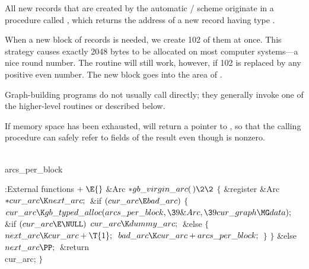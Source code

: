 All new  records that are created by the automatic /
scheme originate in a procedure called , which returns
the
address of a new record having type .

When a new block of  records is needed, we create 102 of them at
once.
This strategy causes exactly 2048 bytes to be allocated on most
computer systems---a nice round number. The routine will still work, however,
if 102 is replaced by any positive even number. The new block goes into
the  area of .

Graph-building programs do not usually call  directly;
they generally invoke one of the higher-level routines 
or  described below.

If memory space has been exhausted,  will return a
pointer to , so that the calling procedure can safely
refer to fields of the result even though  is
nonzero.

\Y\B\4\D\\{arcs\_per\_block}\5
\par
\Y\B\4:External functions\X${}\mathrel+\E{}$\6
\1\1\&{Arc} ${}{*}\\{gb\_virgin\_arc}(\,)\2\2{}$\6
${}\{{}$\5
\1\&{register} \&{Arc} ${}{*}\\{cur\_arc}\K\\{next\_arc};{}$\7
\&{if} ${}(\\{cur\_arc}\E\\{bad\_arc}){}$\5
${}\{{}$\1\6
${}\\{cur\_arc}\K\\{gb\_typed\_alloc}(\\{arcs\_per\_block},\39\&{Arc},\39\\{cur%
\_graph}\MG\\{data});{}$\6
\&{if} ${}(\\{cur\_arc}\E\NULL){}$\1\5
${}\\{cur\_arc}\K\\{dummy\_arc};{}$\2\6
\&{else}\5
${}\{{}$\1\6
${}\\{next\_arc}\K\\{cur\_arc}+\T{1};{}$\6
${}\\{bad\_arc}\K\\{cur\_arc}+\\{arcs\_per\_block};{}$\6
\4${}\}{}$\2\6
\4${}\}{}$\2\6
\&{else}\1\5
${}\\{next\_arc}\PP;{}$\2\6
\&{return} \\{cur\_arc};\6
\4${}\}{}$\2\par
\fi

